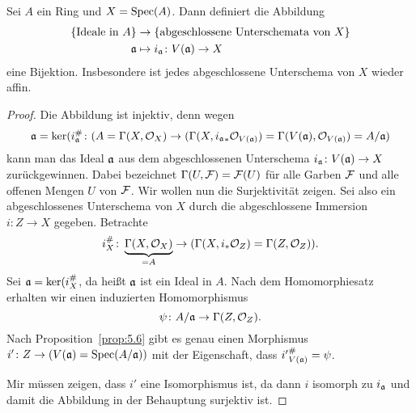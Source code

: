 \begin{thm}
\label{thm:7.4}
	Sei $A$ ein Ring und $X=\operatorname{Spec}(A)$. Dann definiert die Abbildung
	\begin{align*}
		\{\text{Ideale in }A\}&\to \{\text{abgeschlossene Unterschemata von }X\}\\
		\mathfrak{a} &\mapsto i_{\mathfrak{a}}\colon V(\mathfrak{a}) \to X
	\end{align*}
	eine Bijektion. Insbesondere ist jedes abgeschlossene Unterschema von $X$ wieder affin.
	\begin{proof}
		Die Abbildung ist injektiv, denn wegen
		\[
			\mathfrak{a} = \ker(i^{\#}_{\mathfrak{a}}\colon (A = \Gamma(X,\mathcal{O}_X) \to (\Gamma(X,{i_{\mathfrak{a}}}_*\mathcal{O}_{V(\mathfrak{a})}) = \Gamma(V(\mathfrak{a}),\mathcal{O}_{V(\mathfrak{a})}) = A/\mathfrak{a})
		\]
		kann man das Ideal $\mathfrak{a}$ aus dem abgeschlossenen Unterschema $i_{\mathfrak{a}} \colon V(\mathfrak{a}) \to X$ zurückgewinnen. Dabei bezeichnet $\Gamma(U,\mathcal{F}) = \mathcal{F}(U)$ für alle Garben $\mathcal{F}$ und alle offenen Mengen $U$ von $\mathcal{F}$. Wir wollen nun die Surjektivität zeigen. Sei also ein abgeschlossenes Unterschema von $X$ durch die abgeschlossene Immersion $i \colon Z \to X$ gegeben. Betrachte
		\[
			i_X^{\#}\colon \underbrace{\Gamma(X,\mathcal{O}_X)}_{=A} \to (\Gamma(X,i_*\mathcal{O}_Z) = \Gamma(Z,\mathcal{O}_Z)).
		\]
		Sei $\mathfrak{a} = \ker(i_X^{\#}$, da heißt $\mathfrak{a}$ ist ein Ideal in $A$. Nach dem Homomorphiesatz erhalten wir einen induzierten Homomorphismus
		\[
			\psi \colon A/\mathfrak{a} \to \Gamma(Z,\mathcal{O}_Z).
		\]
		Nach Proposition~\ref{prop:5.6} gibt es genau einen Morphismus $i'\colon Z \to (V(\mathfrak{a}) = \operatorname{Spec}(A/\mathfrak{a}))$ mit der Eigenschaft, dass ${i'}^{\#}_{V(\mathfrak{a})} = \psi$.
		\begin{center}
		\end{center}
		Mir müssen zeigen, dass $i'$ eine Isomorphismus ist, da dann $i$ isomorph zu $i_{\mathfrak{a}}$ und damit die Abbildung in der Behauptung surjektiv ist.


\end{proof}
\end{thm}
